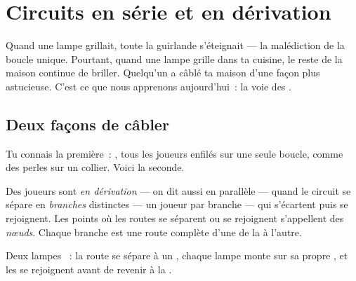 \chapter{Circuits en série et en dérivation}\label{ch:g5:series-parallel-circuits}

Quand une lampe grillait, toute la guirlande s'éteignait --- la
malédiction de la boucle unique. Pourtant, quand une lampe grille
dans ta cuisine, le reste de la maison continue de briller.
Quelqu'un a câblé ta maison d'une façon plus astucieuse. C'est ce que
nous apprenons aujourd'hui~: la voie des .

\section{Deux façons de câbler}

Tu connais la première~: \emph{}, tous les joueurs enfilés
sur une seule boucle, comme des perles sur un collier. Voici la
seconde.

\begin{definition}[En dérivation]\label{def:g5:series-parallel-circuits:parallel}
Des joueurs sont \emph{en dérivation}
--- on dit aussi en parallèle --- quand le circuit se sépare en
\emph{branches} distinctes --- un joueur par
branche --- qui s'écartent puis se rejoignent. Les points où les
routes se séparent ou se rejoignent s'appellent des
\emph{nœuds}. Chaque branche est une route complète d'une
 de la  à l'autre.
\end{definition}

\begin{omfigure}

{\small Deux lampes ~: la route se sépare à un ,
chaque lampe monte sur sa propre , et les  se
rejoignent avant de revenir à la .}
\end{omfigure}


